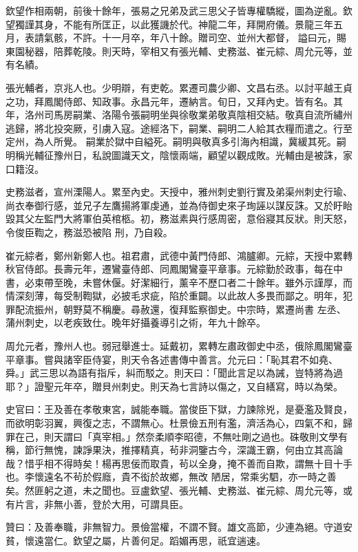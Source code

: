 \begin{pinyinscope}
 欽望作相兩朝，前後十餘年，張易之兄弟及武三思父子皆專權驕縱，圖為逆亂。欽望獨謹其身，不能有所匡正，以此獲譏於代。神龍二年，拜開府儀。景龍三年五月，表請氣骸，不許。十一月卒，年八十餘。贈司空、並州大都督，
 謚曰元，賜東園秘器，陪葬乾陵。則天時，宰相又有張光輔、史務滋、崔元綜、周允元等，並有名績。



 張光輔者，京兆人也。少明辯，有吏乾。累遷司農少卿、文昌右丞。以討平越王貞之功，拜鳳閣侍郎、知政事。永昌元年，遷納言。旬日，又拜內史。皆有名。其年，洛州司馬房嗣業、洛陽令張嗣明坐與徐敬業弟敬真陰相交結。敬真自流所繡州逃歸，將北投突厥，引虜入寇。途經洛下，嗣業、嗣明二人給其衣糧而遣之。行至定州，為人所覺。
 嗣業於獄中自縊死。嗣明與敬真多引海內相識，冀緩其死。嗣明稱光輔征豫州日，私說圖識天文，陰懷兩端，顧望以觀成敗。光輔由是被誅，家口籍沒。



 史務滋者，宣州溧陽人。累至內史。天授中，雅州刺史劉行實及弟渠州刺史行瑜、尚衣奉御行感，並兄子左鷹揚將軍虔通，並為侍御史來子珣誣以謀反誅。又於盱眙毀其父左監門大將軍伯英棺柩。初，務滋素與行感周密，意俗寢其反狀。則天怒，令俊臣鞫之，務滋恐被陷
 刑，乃自殺。



 崔元綜者，鄭州新鄭人也。祖君肅，武德中黃門侍郎、鴻臚卿。元綜，天授中累轉秋官侍郎。長壽元年，遷鸞臺侍郎、同鳳閣鸞臺平章事。元綜勤於政事，每在中書，必束帶至晚，未嘗休偃。好潔細行，薰辛不歷口者二十餘年。雖外示謹厚，而情深刻薄，每受制鞫獄，必披毛求疵，陷於重闢。以此故人多畏而鄙之。明年，犯罪配流振州，朝野莫不稱慶。尋赦還，復拜監察御史。中宗時，累遷尚書
 左丞、蒲州刺史，以老疾致仕。晚年好攝養導引之術，年九十餘卒。



 周允元者，豫州人也。弱冠舉進士。延戴初，累轉左肅政御史中丞，俄除鳳閣鸞臺平章事。嘗與諸宰臣侍宴，則天令各述書傳中善言。允元曰：「恥其君不如堯、舜。」武三思以為語有指斥，糾而駁之。則天曰：「聞此言足以為誡，豈特將為過耶？」證聖元年卒，贈貝州刺史。則天為七言詩以傷之，又自繕寫，時以為榮。



 史官曰：王及善在孝敬東宮，誠能奉職。當俊臣下獄，力諫除兇，是憂濫及賢良，而欲明彰羽翼，興復之志，不謂無心。杜景儉五刑有濫，濟活為心，四氣不和，歸罪在己，則天謂曰「真宰相。」然奈柔順李昭德，不無吐剛之過也。硃敬則文學有稱，節行無愧，諫諍果決，推擇精真，茍非洞鑒古今，深識王霸，何由立其高論哉？惜乎相不得時矣！楊再思佞而取貴，茍以全身，掩不善而自欺，謂無十目十手也。李懷遠名不茍於假廕，貴不衒於故鄉，無改
 陋居，常乘劣駟，亦一時之善矣。然匪躬之道，未之聞也。豆盧欽望、張光輔、史務滋、崔元綜、周允元等，或有片言，非無小善，登於大用，可謂具臣。



 贊曰：及善奉職，非無智力。景儉當權，不謂不賢。雄文高節，少連為絕。守道安貧，懷遠當仁。欽望之屬，片善何足。蹈媚再思，祇宜遄速。



\end{pinyinscope}